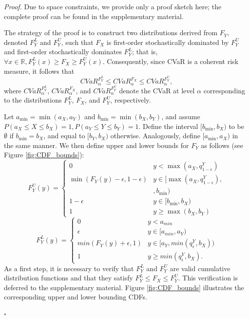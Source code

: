 \documentclass[letterpaper]{article} %
\newenvironment{proof}{\noindent\textit{Proof.}}{\hfill$\square$}
\begin{document}
\begin{proof}
	Due to space constraints, we provide only a proof sketch here; the complete proof can be found in the supplementary material. 
	
	The strategy of the proof is to construct two distributions derived from $F_Y$, denoted $F_Y^L$ and $F_Y^U$, such that $F_X$ is first-order stochastically dominated by $F_Y^U$ and first-order stochastically dominates $F_Y^L$; that is, $\forall x\in \mathbb{R},F_Y^L(x) \geq F_X \geq F_Y^U(x)$. Consequently, since CVaR is a coherent risk measure, it follows that
	\begin{equation}
		CVaR_\alpha^{F_Y^L} \leq CVaR_\alpha^{F_X} \leq CVaR_\alpha^{F_Y^U},
	\end{equation}
	where $CVaR_\alpha^{F_Y^L}$, $CVaR_\alpha^{F_X}$, and $CVaR_\alpha^{F_Y^U}$ denote the CVaR at level $\alpha$ corresponding to the distributions $F_Y^L$, $F_X$, and $F_Y^U$, respectively. 
	
	Let $a_{\min} = \min(a_X, a_Y)$ and $b_{\min} = \min(b_X, b_Y)$, and assume $P(a_X\leq X \leq b_X)=1, P(a_Y\leq Y \leq b_Y)=1$. Define the interval $[b_{\min}, b_X)$ to be $\emptyset$ if $b_{\min} = b_X$, and equal to $[b_Y, b_X)$ otherwise. Analogously, define $[a_{\min}, a_X)$ in the same manner. We then define upper and lower bounds for $F_Y$ as follows (see Figure \ref{fig:CDF_bounds}): 
	\begin{equation}
		F_Y^U(y) = 
		\begin{cases}
			0 & y < \max(a_X, q_{1-\epsilon}^Y) \\
			\min(F_Y(y) - \epsilon, 1 - \epsilon) 
			& y \in [\max(a_X, q_{1-\epsilon}^Y),\\
			& , b_{\min}) \\
			1 - \epsilon & y \in [b_{\min}, b_X) \\
			1 & y \geq \max(b_X, b_Y)
		\end{cases}
	\end{equation}
	\begin{equation}
		F_Y^L(y)=\begin{cases}
			0 & y<a_{min}  \\
			\epsilon & y\in [a_{min}, a_Y) \\
			min(F_Y(y)+\epsilon, 1) & y\in [a_Y, min(q_{\epsilon}^Y, b_X)) \\
			1 & y\geq min(q_\epsilon^Y, b_X).
		\end{cases}
	\end{equation}
	As a first step, it is necessary to verify that $F_Y^L$ and $F_Y^U$ are valid cumulative distribution functions and that they satisfy $F_Y^L \leq F_X \leq F_Y^U$. This verification is deferred to the supplementary material. Figure \ref{fig:CDF_bounds} illustrates the corresponding upper and lower bounding CDFs.
	

\end{proof}
\end{document}
